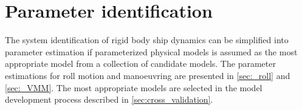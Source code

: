 \chapter{Parameter identification}\label{ch:methods}
The system identification of rigid body ship dynamics can be simplified into parameter estimation if parameterized physical models is assumed as the most appropriate model from a collection of candidate models.
The parameter estimations for roll motion and manoeuvring are presented in \autoref{sec:_roll} and \autoref{sec:_VMM}. The most appropriate models are selected in the model development process described in \autoref{sec:cross_validation}.






%
%







